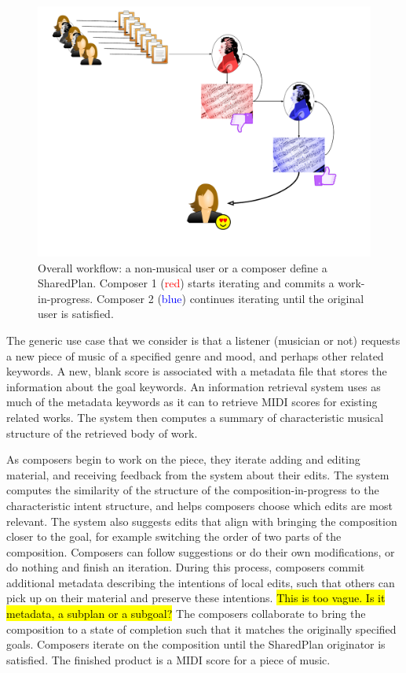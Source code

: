 \documentclass[final,authoryear,5p,times,twocolumn]{elsarticle}
\begin{document}
\begin{figure}
	\includegraphics[scale=0.35]{workflow.pdf}
	\caption{Overall workflow: a non-musical user or a composer define a SharedPlan. Composer 1 (\textcolor{red}{red}) starts
	iterating and commits a work-in-progress. Composer 2 (\textcolor{blue}{blue}) continues iterating until the original user is
	satisfied.}
	\label{fig:workflow}
\end{figure}

The generic use case that we consider is that a listener (musician or not) requests a new piece of music of a specified genre and mood, and perhaps other related keywords. A new, blank score is associated with a metadata file that stores the information about the goal keywords. An information retrieval system uses as much of the metadata keywords as it can to retrieve MIDI scores for existing related works. The system then computes a summary of characteristic musical structure of the retrieved body of work.

As composers begin to work on the piece, they iterate adding and editing material, and receiving feedback from the system about their edits. The system computes the similarity of the structure of the composition-in-progress to the characteristic intent structure, and helps composers choose which edits are most relevant. The system also suggests edits that align with bringing the composition closer to the goal, for example switching the order of two parts of the composition. Composers can follow suggestions or do their own modifications, or do nothing and finish an iteration. During this process, composers commit additional metadata describing the intentions of local edits, such that others can pick up on their material and preserve these intentions. \hl{This is too vague. Is it metadata, a subplan or a subgoal?} The composers collaborate to bring the composition to a state of completion such that it matches the originally specified goals. Composers iterate on the composition until the SharedPlan originator is satisfied. The finished product is a MIDI score for a piece of music.
 
\end{document}
